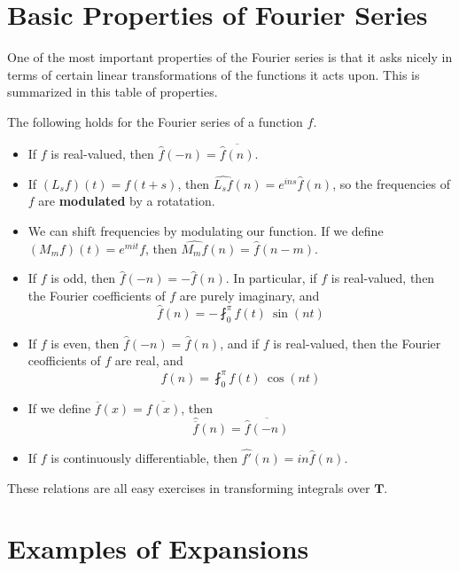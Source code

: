\section{Basic Properties of Fourier Series}

One of the most important properties of the Fourier series is that it asks nicely in terms of certain linear transformations of the functions it acts upon. This is summarized in this table of properties.

\begin{theorem}
	The following holds for the Fourier series of a function $f$.
    \begin{itemize}
        \item If $f$ is real-valued, then $\widehat{f}(-n) = \overline{\widehat{f}(n)}$.

        \item If $(L_s f)(t) = f(t+s)$, then $\widehat{L_s f}(n) = e^{ins} \widehat{f}(n)$, so the frequencies of $f$ are {\bf modulated} by a rotatation.

        \item We can shift frequencies by modulating our function. If we define $(M_m f)(t) = e^{mit} f$, then $\widehat{M_m f}(n) = \widehat{f}(n - m)$.

        \item If $f$ is odd, then $\widehat{f}(-n) = -\widehat{f}(n)$. In particular, if $f$ is real-valued, then the Fourier coefficients of $f$ are purely imaginary, and
        \[ \widehat{f}(n) = - \fint_0^\pi f(t)\ \sin(nt) \]

        \item If $f$ is even, then $\widehat{f}(-n) = \widehat{f}(n)$, and if $f$ is real-valued, then the Fourier ceofficients of $f$ are real, and
        \[ \widehat{f}(n) = \fint_0^\pi f(t)\ \cos(nt) \]

        \item If we define $\overline{f}(x) = \overline{f(x)}$, then
        \[ \widehat{\overline{f}}(n) = \overline{\widehat{f}(-n)} \]

        \item If $f$ is continuously differentiable, then $\widehat{f'}(n) = in \widehat{f}(n)$.
    \end{itemize}
    These relations are all easy exercises in transforming integrals over $\mathbf{T}$.
\end{theorem}

\section{Examples of Expansions}

